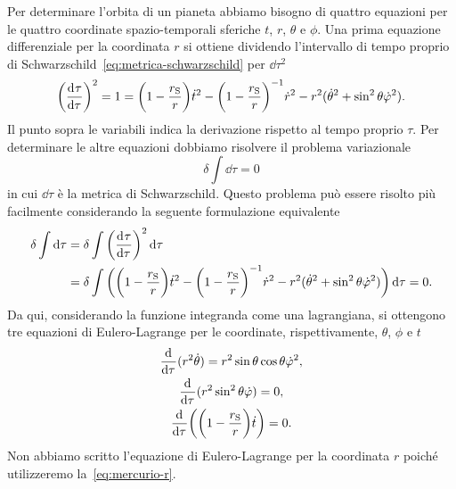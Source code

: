 Per determinare l'orbita di un pianeta abbiamo bisogno di quattro equazioni per
le quattro coordinate spazio-temporali sferiche $t$, $r$, $\theta$ e $\phi$.
Una prima equazione differenziale per la coordinata $r$ si ottiene dividendo
l'intervallo di tempo proprio di Schwarzschild~\eqref{eq:metrica-schwarzschild}
per $\dd\tau^{2}$
\begin{equation}
  \label{eq:mercurio-r}
  \bigg(\frac{{\mathop{}\!\mathrm{d}^{}}\tau}{\mathop{}\!\mathrm{d} {\tau}^{}}\bigg)^{2} = 1 = \bigg(1 -
  \frac{r_{\textup{S}}}{r}\bigg)\dot{t}^{2} - \bigg(1 -
  \frac{r_{\textup{S}}}{r}\bigg)^{-1}\dot{r}^{2} - r^{2}(\dot{\theta}^{2} +
  \sin^{2}\theta \dot{\varphi}^{2}).
\end{equation}
Il punto sopra le variabili indica la derivazione rispetto al tempo proprio
$\tau$.  Per determinare le altre equazioni dobbiamo risolvere il problema
variazionale
\begin{equation}
  \delta \int \dd \tau = 0
\end{equation}
in cui $\dd\tau$ è la metrica di Schwarzschild.  Questo problema può essere
risolto più facilmente considerando la seguente formulazione equivalente
\begin{equation}
  \begin{split}
    \delta\int \mathop{}\!\mathrm{d}\tau &= \delta \int \bigg(\frac{{\mathop{}\!\mathrm{d}^{}}\tau}{\mathop{}\!\mathrm{d} {\tau}^{}}\bigg)^{2} \mathop{}\!\mathrm{d}
    \tau \\
    &= \delta \int \bigg(\bigg(1 - \frac{r_{\textup{S}}}{r}\bigg)\dot{t}^{2} -
    \bigg(1 - \frac{r_{\textup{S}}}{r}\bigg)^{-1}\dot{r}^{2} -
    r^{2}(\dot{\theta}^{2} + \sin^{2}\theta \dot{\varphi}^{2}) \bigg) \mathop{}\!\mathrm{d} \tau = 0.
  \end{split}
\end{equation}
Da qui, considerando la funzione integranda come una lagrangiana, si ottengono
tre equazioni di Eulero-Lagrange per le coordinate, rispettivamente, $\theta$,
$\phi$ e $t$
\begin{subequations}
  \begin{gather}
    \frac{{\mathop{}\!\mathrm{d}^{}}}{\mathop{}\!\mathrm{d} {\tau}^{}}(r^{2}\dot{\theta}) = r^{2}\sin\theta\cos\theta
    \dot{\varphi}^{2}, \label{eq:mercurio-mu} \\
    \frac{{\mathop{}\!\mathrm{d}^{}}}{\mathop{}\!\mathrm{d} {\tau}^{}}(r^{2} \sin^{2}\theta \dot{\varphi}) = 0, \label{eq:mercurio-phi}
    \\
    \frac{{\mathop{}\!\mathrm{d}^{}}}{\mathop{}\!\mathrm{d} {\tau}^{}}\bigg(\bigg(1 - \frac{r_{\textup{S}}}{r}\bigg) \dot{t} \bigg)
    = 0. \label{eq:mercurio-t}
  \end{gather}
\end{subequations}
Non abbiamo scritto l'equazione di Eulero-Lagrange per la coordinata $r$ poiché
utilizzeremo la~\eqref{eq:mercurio-r}.

